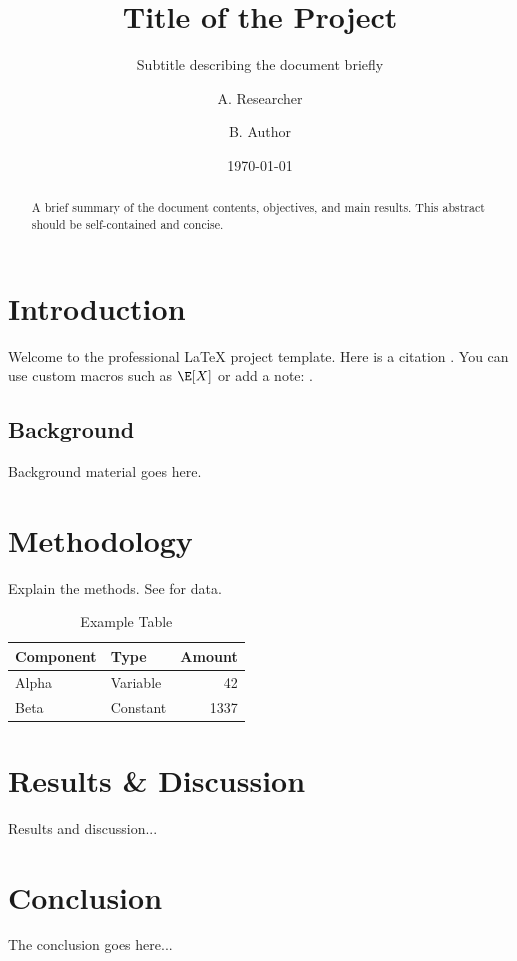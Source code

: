 \documentclass[11pt, a4paper]{article}
\title{Title of the Project}
\subtitle{Subtitle describing the document briefly}
\author{A. Researcher \and B. Author}
\date{\today}
\begin{document}


\begin{abstract}
    A brief summary of the document contents, objectives, and main results. This abstract should be self-contained and concise.
\end{abstract}

\newpage
\tableofcontents
\newpage

\section{Introduction}
Welcome to the professional LaTeX project template. Here is a citation \cite{example2026}. You can use custom macros such as $\E[X]$ or add a note: .

\subsection{Background}
Background material goes here.

\section{Methodology}
Explain the methods. See  for data.

\begin{table}[ht]
    \centering
    \caption{Example Table}
    \label{tab:example}
    \begin{tabular}{llr}
        \toprule
        \textbf{Component} & \textbf{Type} & \textbf{Amount} \\
        \midrule
        Alpha              & Variable      & 42              \\
        Beta               & Constant      & 1337            \\
        \bottomrule
    \end{tabular}
\end{table}

\section{Results \& Discussion}
Results and discussion...

\section{Conclusion}
The conclusion goes here...

% 
% 
\end{document}
